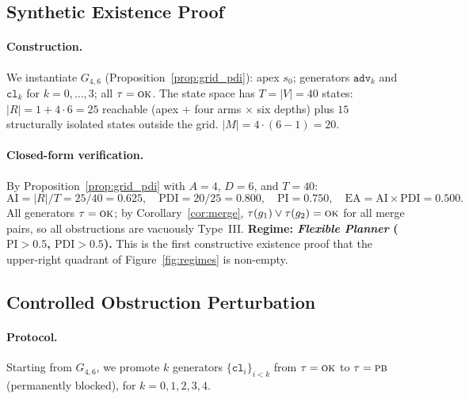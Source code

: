 \documentclass[11pt,letterpaper]{article}
\theoremstyle{plain}
\theoremstyle{definition}
\theoremstyle{remark}
\newcommand{\PDI}{\mathrm{PDI}}
\newcommand{\AI}{\mathrm{AI}}
\newcommand{\PI}{\mathrm{PI}}
\newcommand{\EA}{\mathrm{EA}}
\newcommand{\OK}{\textup{\textsc{ok}}}
\newcommand{\PB}{\textup{\textsc{pb}}}
\newcommand{\jn}{\vee}  %
\begin{document}
\subsection{Synthetic Existence Proof}
\label{sec:existence}

\paragraph{Construction.}
We instantiate $G_{4,6}$ (Proposition~\ref{prop:grid_pdi}):
apex $s_0$; generators $\texttt{adv}_k$ and $\texttt{cl}_k$ for $k=0,\ldots,3$;
all $\tau = \OK$.
The state space has $T = |V| = 40$ states:
$|R| = 1 + 4{\cdot}6 = 25$ reachable (apex + four arms $\times$ six depths)
plus $15$ structurally isolated states outside the grid.
$|M| = 4{\cdot}(6-1) = 20$.

\paragraph{Closed-form verification.}
By Proposition~\ref{prop:grid_pdi} with $A=4$, $D=6$, and $T=40$:
\[
  \AI = |R|/T = 25/40 = 0.625,\quad
  \PDI = 20/25 = 0.800,\quad
  \PI = 0.750,\quad
  \EA = \AI \times \PDI = 0.500.
\]
All generators $\tau = \OK$; by Corollary~\ref{cor:merge},
$\tau(g_1) \jn \tau(g_2) = \OK$ for all merge pairs,
so all obstructions are vacuously Type~III.
\textbf{Regime: \emph{Flexible Planner} ($\PI > 0.5$, $\PDI > 0.5$).}
This is the first constructive existence proof that the upper-right
quadrant of Figure~\ref{fig:regimes} is non-empty.

\subsection{Controlled Obstruction Perturbation}
\label{sec:perturbation}

\paragraph{Protocol.}
Starting from $G_{4,6}$, we promote $k$ generators
$\{\texttt{cl}_i\}_{i < k}$ from $\tau=\OK$ to $\tau=\PB$
(permanently blocked), for $k = 0,1,2,3,4$.
\end{document}
